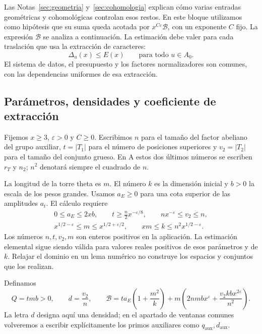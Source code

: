 Las Notas~\ref{sec:geometria} y~\ref{sec:cohomologia} explican cómo
varias entradas geométricas y cohomológicas controlan esos restos.
En este bloque utilizamos como hipótesis que su suma queda acotada por
$x^{C\varepsilon}\mathcal B$, con un exponente $C$ fijo.
La expresión $\mathcal B$ se analiza a continuación. La estimación
debe valer para cada traslación que usa la extracción de caracteres:
\[
 \Delta_u(x)\le E(x)\qquad\text{para todo }u\in A_0.
\]
El sistema de datos, el presupuesto y los factores normalizadores
son comunes, con las dependencias uniformes de esa extracción.

\subsection{Parámetros, densidades y coeficiente de extracción}

Fijemos $x\ge3$, $\varepsilon>0$ y $C\ge0$. Escribimos
$n$ para el tamaño del factor abeliano del grupo auxiliar,
$t=|T_1|$ para el número de posiciones superiores y
$v_2=|T_2|$ para el tamaño del conjunto grueso. En A estos dos últimos
números se escriben $r_T$ y $n_2$; $n^2$ denotará siempre el
cuadrado de $n$.

La longitud de la torre theta es $m$. El número $k$ es la dimensión
inicial y $b>0$ la escala de los pesos grandes. Usamos $a_E\ge0$
para una cota superior de las amplitudes $a_t$. El cálculo requiere
\begin{equation}
 \begin{gathered}
 0\le a_E\le2xb,\qquad
 t\ge\frac n2x^{-\varepsilon/8},\qquad
 nx^{-\varepsilon}\le v_2\le n,\\
 x^{1/2-\varepsilon}\le m\le x^{1/2+\varepsilon/2},
 \qquad
 xm\le k\le n^2x^{1/2-\varepsilon}.
 \end{gathered}
 \label{eq:par-rangos}
\end{equation}
Los números $n,t,v_2,m$ son enteros positivos en la aplicación.
La estimación elemental sigue siendo válida para valores reales
positivos de esos parámetros y de $k$. Relajar el dominio en un
lema numérico no construye los espacios y conjuntos que los realizan.

Definamos
\begin{equation}
 Q=tmb>0,\qquad d=\frac{v_2}{n},\qquad
 \mathcal B=
 ta_E\left(1+\frac{m^2}{k}\right)
 +m\left(2nmbx^\varepsilon+
               \frac{v_2kbx^{2\varepsilon}}{n^2}\right).
 \label{eq:par-presupuesto}
\end{equation}
La letra $d$ designa aquí una densidad; en el apartado de ventanas
comunes volveremos a escribir explícitamente los primos auxiliares
como $q_{\mathrm{aux}},d_{\mathrm{aux}}$.

